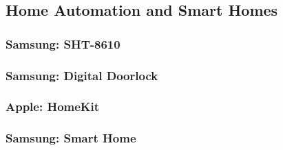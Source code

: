 \subsection{Home Automation and Smart Homes}

\subsubsection{Samsung: SHT-8610}

\subsubsection{Samsung: Digital Doorlock}

\subsubsection{Apple: HomeKit}

\subsubsection{Samsung: Smart Home}